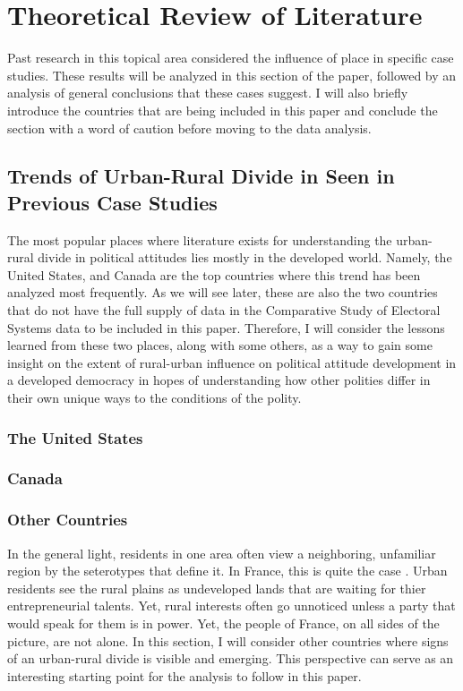 \documentclass[12pt, titlepage]{article}
\begin{document}
\section{Theoretical Review of Literature}

Past research in this topical area considered the influence of place in specific case studies. These results will be analyzed in this section of the paper, followed by an analysis of general conclusions that these cases suggest. I will also briefly introduce the countries that are being included in this paper and conclude the section with a word of caution before moving to the data analysis. 

\subsection{Trends of Urban-Rural Divide in Seen in Previous Case Studies}

The most popular places where literature exists for understanding the urban-rural divide in political attitudes lies mostly in the developed world. Namely, the United States, and Canada are the top countries where this trend has been analyzed most frequently. As we will see later, these are also the two countries that do not have the full supply of data in the Comparative Study of Electoral Systems data to be included in this paper. Therefore, I will consider the lessons learned from these two places, along with some others, as a way to gain some insight on the extent of rural-urban influence on political attitude development in a developed democracy in hopes of understanding how other polities differ in their own unique ways to the conditions of the polity.

\subsubsection{The United States}

\subsubsection{Canada}

\subsubsection{Other Countries}

In the general light, residents in one area often view a neighboring, unfamiliar region by the seterotypes that define it. In France, this is quite the case \citep{clout_new_2003}. Urban residents see the rural plains as undeveloped lands that are waiting for thier entrepreneurial talents. Yet, rural interests often go unnoticed unless a party that would speak for them is in power. Yet, the people of France, on all sides of the picture, are not alone. In this section, I will consider other countries where signs of an urban-rural divide is visible and emerging. This perspective can serve as an interesting starting point for the analysis to follow in this paper.
\end{document}
